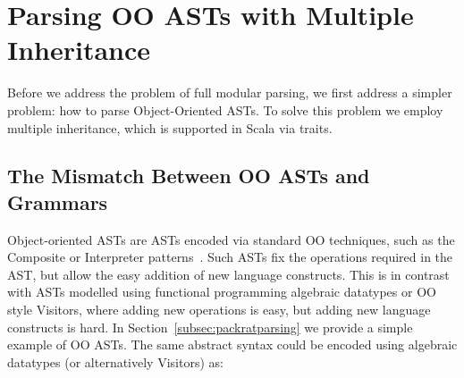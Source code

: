 \begin{comment}
Basically, \name consists of four parts: underlying parsing technique, delegation mechanism encoded by open recursion, Object Algebras, and glue code of new combinators and utility functions. We start from Section \ref{subsec:overview-parsing}, which discusses the choice of parsing technique and how it affects modularity of parsers. Section \ref{subsec:overview-problem} demonstrates the goal of extending parsers together with ASTs in a semantic modular way, with both separate compilation and type-safe code reuse. Then we will see traditional parser combinators fail to achieve it because of hard-coded recursive calls. In Section \ref{subsec:overview-delegation}, we show how delegation can solve this problem and allow us to build extensible parsers. Finally, Section \ref{subsec:overview-oa} gives examples of using Object Algebras for more extensibility, including extension of operations and parsing multiple sorts of syntax.\haoyuan{TODO}
\end{comment}

\begin{comment}
It is worth mentioning that the choice of parser combinators will not
affect the other parts of our library. One can choose other parser
combinators like Parsec, in cases that the performance and supporting
of left-recursion are not major concerns. A different library can even build a new
\name with fancy features or higher efficiency.
\end{comment}


\section{Parsing OO ASTs with Multiple Inheritance}\label{sec:inheritance}

Before we address the problem of full modular parsing, we first
address a simpler problem: how to parse Object-Oriented ASTs. To solve
this problem we employ multiple inheritance, which is supported in
Scala via traits.

\subsection{The Mismatch Between OO ASTs and Grammars}
Object-oriented ASTs are ASTs encoded via standard OO techniques,
such as the {\sc Composite} or {\sc Interpreter} patterns~\cite{gamma1995design}. Such ASTs
fix the operations required in the AST, but allow the easy addition of new
language constructs. This is in contrast with ASTs modelled using
functional programming algebraic datatypes or OO style Visitors, where
adding new operations is easy, but adding new language constructs is hard.
In Section~\ref{subsec:packratparsing} we provide a simple example of OO ASTs. The same abstract syntax could be encoded using algebraic datatypes (or alternatively Visitors)
as:

